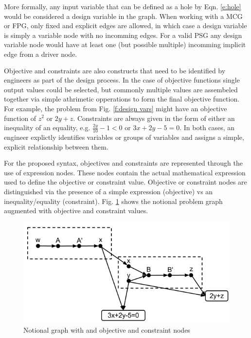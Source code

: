 More formally, any input variable that can be defined as a hole by Eqn. \ref{e:hole}
would be considered a design variable in the graph. When working with a MCG or FPG, only fixed and explicit edges are allowed, 
in which case a design variable is simply a variable node with no incomming edges. For a valid PSG 
any design variable node would have at least one (but possible multiple) incomming 
implicit edge from a driver node. 

Objective and constraints are also constructs that need to be identified by engineers 
as part of the design process. In the case of objective functions single output values 
could be selected, but commonly multiple values are assembeled together via simple 
athrimetic opperations to form the final objective function. For example, the problem from 
Fig. \ref{f:design vars} might have an objective function of $z^2$ or $2y + z$. Constraints are 
always given in the form of either an inequality of an equality, e.g. 
$\frac{2y}{10}-1<0$ or $3x+2y - 5=0$. In both cases, an engineer explictly identifies variables 
or groups of variables and assigns a simple, explicit relationship between them. 

For the proposed syntax, objectives and constraints are represented through the use of 
expression nodes. These nodes contain the actual mathematical expression used to define the 
objective or constraint value. Objective or constraint nodes are distinguished
via the presence of a simple expression (objective) vs an inequality/equality (constraint). 
Fig. \ref{f:obj-cons} shows the notional problem graph augmented with objective and 
constraint values. 

\begin{figure}[htb!]
  \begin{center}
    \includegraphics[width=.6\textwidth]{images/obj_const_graph}
  \end{center}
  \caption{Notional graph with and objective and constraint nodes \label{f:obj-cons}}
\end{figure}

